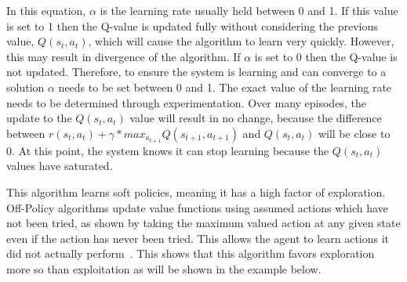 \documentclass[12pt,american]{report}
\begin{document}
In this equation, \textit{$\alpha$} is the learning rate usually held between 0 and 1.  If this value is set to 1 then the Q-value is updated fully without considering the previous value, \textit{$Q(s_t,a_t)$}, which will cause the algorithm to learn very quickly. However, this may result in divergence of the algorithm.  If \textit{$\alpha$} is set to 0 then the Q-value is not updated.  Therefore, to ensure the system is learning and can converge to a solution \textit{$\alpha$} needs to be set between 0 and 1. The exact value of the learning rate needs to be determined through experimentation. Over many episodes, the update to the $Q(s_{t},a_{t})$ value will result in no change, because the difference between $r(s_{t},a_{t}) + \gamma*max_{a_{t+1} }Q(s_{t+1},a_{t+1})$ and $Q(s_{t},a_{t})$ will be close to 0.  At this point, the system knows it can stop learning because the $Q(s_{t},a_{t})$ values have saturated.
        
This algorithm learns soft policies, meaning it has a high factor of exploration. Off-Policy algorithms update value functions using assumed actions which have not been tried, as shown by taking the maximum valued action at any given state even if the action has never been tried.  This allows the agent to learn actions it did not actually perform~\cite{Eden}. This shows that this algorithm favors exploration more so than exploitation as will be shown in the example below.  
\end{document}
